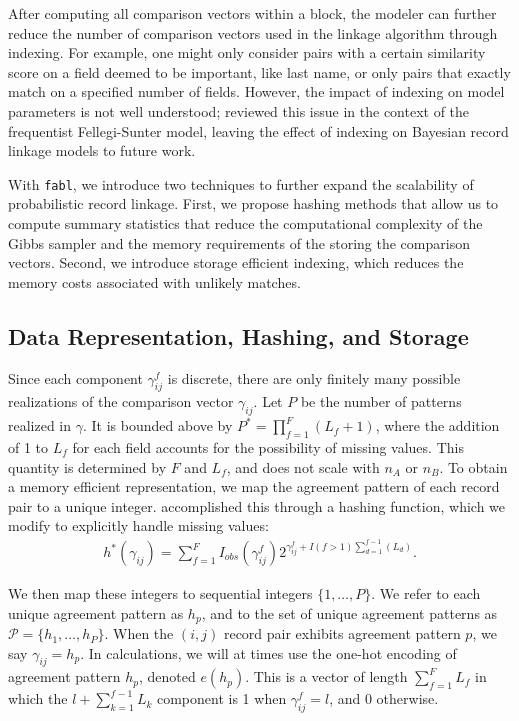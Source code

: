 \documentclass[ba]{imsart}
\begin{document}
After computing all comparison vectors within a block, the modeler can further reduce the number of comparison vectors used in the linkage algorithm through indexing. For example, one might only consider pairs with a certain similarity score on a field deemed to be important, like last name, or only pairs that exactly match on a specified number of fields. However, the impact of indexing on model parameters is not well understood; \citep{murray2016probabilistic} reviewed this issue in the context of the frequentist Fellegi-Sunter model, leaving the effect of indexing on Bayesian record linkage models to future work.

With \texttt{fabl}, we introduce two techniques to further expand the scalability of probabilistic record linkage. First, we propose hashing methods that allow us to compute summary statistics that reduce the computational complexity of the Gibbs sampler and the memory requirements of the storing the comparison vectors. Second, we introduce storage efficient indexing, which reduces the memory costs associated with unlikely matches. 


\hypertarget{data-representation-hashing-and-storage}{%
	\subsection{Data Representation, Hashing, and
		Storage}\label{data-representation-hashing-and-storage}}
	
Since each component $\gamma_{ij}^f$ is discrete, there are only finitely many possible realizations of the comparison vector $\gamma_{ij}$. Let $P$ be the number of patterns realized in $\gamma$. It is bounded above by $P^{*} =  \prod_{f=1}^F (L_f + 1)$, where the addition of 1 to $L_f$ for each field accounts for the possibility of missing values. This quantity is determined by $F$ and $L_f$, and does not scale with $n_A$ or $n_B$. To obtain a memory efficient representation, we map the agreement pattern of each record pair to a unique integer. \cite{enamorado2019using} accomplished this through a hashing function, which we modify to explicitly handle missing values:
\begin{align}
	\label{eqn:hashing}
	h^{*}(\gamma_{ij}) = \sum_{f = 1}^F I_{obs}(\gamma_{ij}^f)2^{\gamma_{ij}^f + I(f>1)\sum_{d=1}^{f-1}(L_d)}.
\end{align}

We then map these integers to sequential integers $\{1, \ldots, P\}$. We refer to each unique agreement pattern as $h_p$, and to the set of unique agreement patterns as $\mathcal{P} = \{h_1, \ldots, h_P\}$. When the $(i,j)$ record pair exhibits agreement pattern $p$, we say $\gamma_{ij} = h_p$. In calculations, we will at times use the one-hot encoding of agreement pattern $h_p$, denoted $e(h_p)$. This is a vector of length $\sum_{f=1}^F L_f$ in which the $l + \sum_{k=1}^{f-1} L_k$ component is 1 when $\gamma_{ij}^f = l$, and 0 otherwise. 
\end{document}
